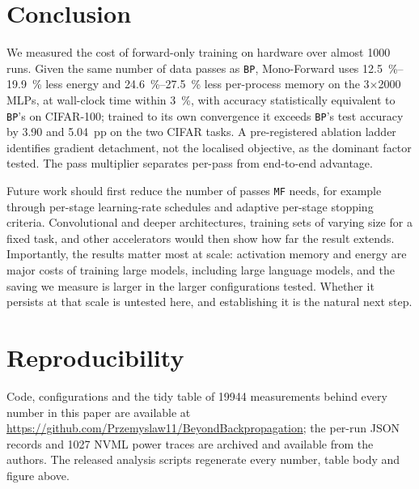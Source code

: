 \documentclass{llncs}
\newcommand{\MF}{\texttt{MF}}
\newcommand{\BP}{\texttt{BP}}
\begin{document}
\section{Conclusion}
\label{sec:conclusion}

We measured the cost of forward-only training on hardware over almost
\num{1000} runs. Given the same number of data passes as \BP{}, Mono-Forward uses
\SIrange{12.5}{19.9}{\percent} less energy and \SIrange{24.6}{27.5}{\percent}
less per-process memory on the \num{3}$\times$\num{2000} MLPs, at wall-clock
time within \SI{3}{\percent}, with accuracy statistically equivalent to
\BP{}'s on CIFAR-100; trained to its own convergence it exceeds \BP{}'s test
accuracy by \num{3.90} and \num{5.04}~pp on the two CIFAR tasks. A
pre-registered ablation ladder identifies gradient detachment, not the
localised objective, as the dominant factor tested. The pass multiplier
separates per-pass from end-to-end advantage.

Future work should first reduce the number of passes \MF{} needs, for example
through per-stage learning-rate schedules and adaptive per-stage stopping criteria. Convolutional
and deeper architectures, training sets of varying size for a fixed task, and
other accelerators would then show how far the result extends. Importantly, the results matter most at scale:
activation memory and energy are major costs of training large models,
including large language models, and the saving we measure is larger in the
larger configurations tested. Whether it persists at that scale is untested
here, and establishing it is the natural next step.


\section*{Reproducibility}
\label{sec:repository}

Code, configurations and the tidy table of \num{19944} measurements behind
every number in this paper are available at
\url{https://github.com/Przemyslaw11/BeyondBackpropagation}; the per-run JSON
records and \num{1027} NVML power traces are archived and available from the
authors. The released analysis scripts regenerate every number, table body and
figure above.
\end{document}
